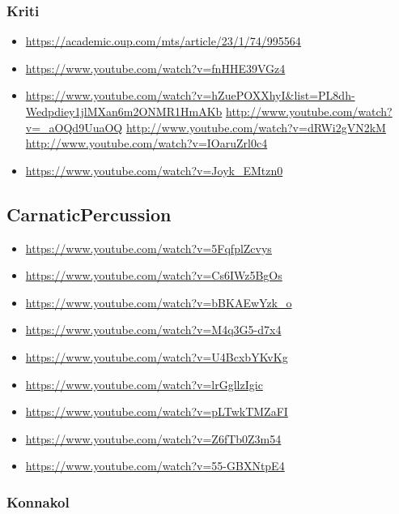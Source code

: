 \subsubsection{Kriti}
\label{sec:org2c0ad95}
\begin{itemize}
\item \url{https://academic.oup.com/mts/article/23/1/74/995564}
\item \url{https://www.youtube.com/watch?v=fnHHE39VGz4}
\item \url{https://www.youtube.com/watch?v=hZuePOXXhyI\&list=PL8dh-Wedpdiey1jlMXan6m2ONMR1HmAKb}
\url{http://www.youtube.com/watch?v=\_aOQd9UuaOQ}
\url{http://www.youtube.com/watch?v=dRWi2gVN2kM}
\url{http://www.youtube.com/watch?v=IOaruZrl0c4}
\item \url{https://www.youtube.com/watch?v=Joyk\_EMtzn0}
\end{itemize}

\subsection{CarnaticPercussion}
\label{sec:org209f39a}
\begin{itemize}
\item \url{https://www.youtube.com/watch?v=5FqfplZcvys}
\item \url{https://www.youtube.com/watch?v=Cs6IWz5BgOs}
\item \url{https://www.youtube.com/watch?v=bBKAEwYzk\_o}
\item \url{https://www.youtube.com/watch?v=M4q3G5-d7x4}
\item \url{https://www.youtube.com/watch?v=U4BcxbYKvKg}
\item \url{https://www.youtube.com/watch?v=lrGgllzIgic}
\item \url{https://www.youtube.com/watch?v=pLTwkTMZaFI}
\item \url{https://www.youtube.com/watch?v=Z6fTb0Z3m54}
\item \url{https://www.youtube.com/watch?v=55-GBXNtpE4}
\end{itemize}

\subsubsection{Konnakol}
\label{sec:org49f1ce0}

